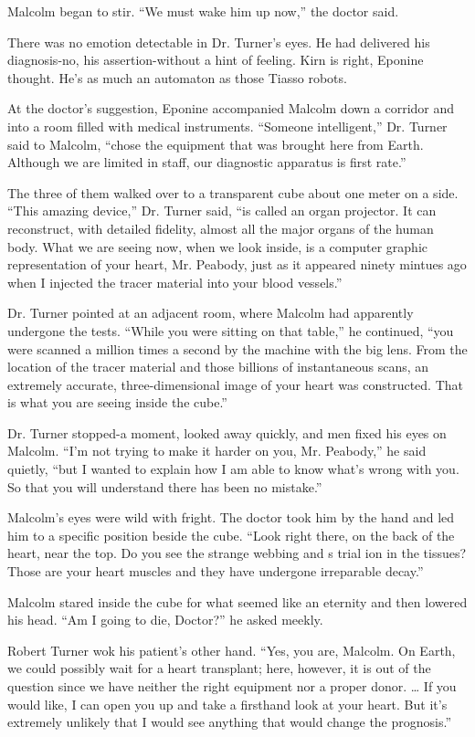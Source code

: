 \documentclass[]{article}
\begin{document}
{Malcolm began to stir. “We must wake him up now,” the doctor said.

There was no emotion detectable in Dr. Turner’s eyes. He had delivered his diagnosis-no, his assertion-without a hint of feeling. Kirn is right, Eponine thought. He’s as much an automaton as those Tiasso robots.

At the doctor’s suggestion, Eponine accompanied Malcolm down a corridor and into a room filled with medical instruments. “Someone intelligent,” Dr. Turner said to Malcolm, “chose the equipment that was brought here from Earth. Although we are limited in staff, our diagnostic apparatus is first rate.”

The three of them walked over to a transparent cube about one meter on a side. “This amazing device,” Dr. Turner said, “is called an organ projector. It can reconstruct, with detailed fidelity, almost all the major organs of the human body. What we are seeing now, when we look inside, is a computer graphic representation of your heart, Mr. Peabody, just as it appeared ninety mintues ago when I injected the tracer material into your blood vessels.”

Dr. Turner pointed at an adjacent room, where Malcolm had apparently undergone the tests. “While you were sitting on that table,” he continued, “you were scanned a million times a second by the machine with the big lens. From the location of the tracer material and those billions of instantaneous scans, an extremely accurate, three-dimensional image of your heart was constructed. That is what you are seeing inside the cube.”

Dr. Turner stopped-a moment, looked away quickly, and men fixed his eyes on Malcolm. “I’m not trying to make it harder on you, Mr. Peabody,” he said quietly, “but I wanted to explain how I am able to know what’s wrong with you. So that you will understand there has been no mistake.”

Malcolm’s eyes were wild with fright. The doctor took him by the hand and led him to a specific position beside the cube. “Look right there, on the back of the heart, near the top. Do you see the strange webbing and s trial ion in the tissues? Those are your heart muscles and they have undergone irreparable decay.”

Malcolm stared inside the cube for what seemed like an eternity and then lowered his head. “Am I going to die, Doctor?” he asked meekly.

Robert Turner wok his patient’s other hand. “Yes, you are, Malcolm. On Earth, we could possibly wait for a heart transplant; here, however, it is out of the question since we have neither the right equipment nor a proper donor. … If you would like, I can open you up and take a firsthand look at your heart. But it’s extremely unlikely that I would see anything that would change the prognosis.”

}
\end{document}
